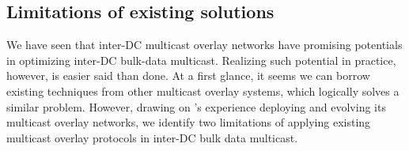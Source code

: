 %
%
%
%

\subsection{Limitations of existing solutions}
\label{subsec:motivation:baseline}


We have seen that inter-DC multicast overlay networks have
promising potentials in optimizing inter-DC bulk-data multicast.
Realizing such potential in practice, however,
is easier said than done.
At a first glance, it seems we can borrow existing techniques
from other multicast overlay systems, which logically solves a
similar problem.
However, drawing on \company's experience deploying and evolving
its multicast overlay networks, we identify two limitations of
applying existing multicast overlay protocols in inter-DC bulk
data multicast.


